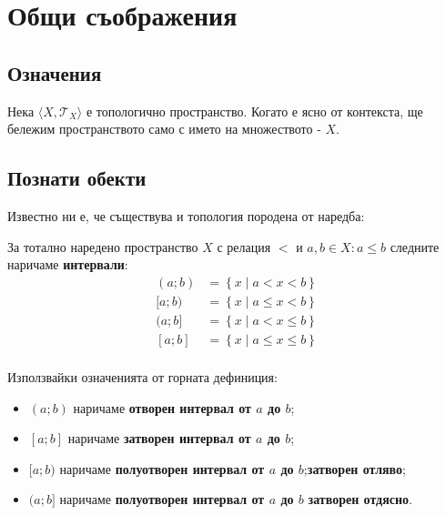\section{Общи съображения}
\subsection{Означения}
\begin{notation}
    Нека $\langle X, \mathcal T_X\rangle$ е топологично пространство. Когато е ясно от контекста, ще бележим пространството само с името на множеството - $X$.
\end{notation}

\subsection{Познати обекти}
Известно ни е, че съществува и топология породена от наредба:
\begin{definition}
    За тотално наредено пространство $X$ с релация $<$ и $a, b \in X: a \leq b$ следните наричаме \textbf{интервали}:
    \begin{equation*}
        \begin{split}
            (a; b) & = \left\{x\mid a < x < b\right\} \\
            [a; b) & = \left\{x\mid a \leq x < b\right\} \\
            (a; b] & = \left\{x\mid a < x \leq b\right\} \\
            [a; b] & = \left\{x\mid a \leq x \leq b\right\} \\
        \end{split}
    \end{equation*}
\end{definition}
\begin{notation}
    Използвайки означенията от горната дефиниция:
    \begin{itemize}
        \item $(a; b)$ наричаме \textbf{отворен интервал от $a$ до $b$};
        \item $[a; b]$ наричаме \textbf{затворен интервал от $a$ до $b$};
        \item $[a; b)$ наричаме \textbf{полуотворен интервал от $a$ до $b$};\textbf{затворен отляво};
        \item $(a; b]$ наричаме \textbf{полуотворен интервал от $a$ до $b$} \textbf{затворен отдясно}.
    \end{itemize}
\end{notation}
